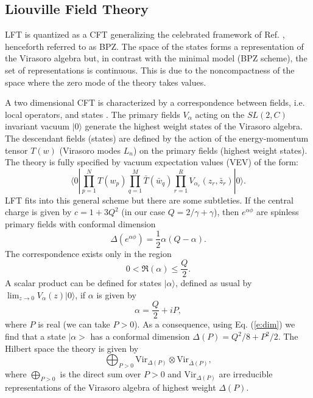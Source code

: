 \documentclass[a4paper,aps,prd,twocolumn,groupedaddress]{revtex4}
\begin{document}
\subsection{Liouville Field Theory}
LFT is quantized as a CFT generalizing the celebrated framework of
Ref. \cite{bpz}, henceforth referred to as BPZ. The space of the
states forms a representation of the Virasoro algebra but, in contrast
with the minimal model (BPZ scheme), the set of representations is
continuous. This is due to the noncompactness of the space where the
zero mode of the theory takes values.

A two dimensional CFT is characterized by a correspondence between
fields, i.e. local operators, and states \cite{cft}. The primary
fields $V_\alpha$ acting on the $SL(2,C)$ invariant vacuum $|0\rangle$
generate the highest weight states of the Virasoro algebra. The
descendant fields (states) are defined by the action of the
energy-momentum tensor $T(w)$ (Virasoro modes $L_n$) on the primary
fields (highest weight states). The theory is fully specified by
vacuum expectation values (VEV) of the form:
\begin{equation}\label{e:vacuum}
\langle 0 | \prod_{p=1}^N T(w_p) \prod_{q=1}^M \bar{T}(\bar{w}_q)
\prod_{r=1}^R V_{\alpha_r}(z_r,\bar{z}_r) | 0 \rangle .
\end{equation}
LFT fits into this general scheme but there are some subtleties. 
If the central
charge is given by $c=1+3Q^2$ (in our case $Q=2/\gamma + \gamma$),
then $e^{\alpha\phi}$ are spinless primary fields with conformal
dimension
\begin{equation}\label{e:dim}
\Delta(e^{\alpha\phi}) = \frac{1}{2}\alpha(Q-\alpha).
\end{equation}
The correspondence exists only in the
region
\begin{displaymath}
0 < \Re(\alpha) \le \frac{Q}{2}.
\end{displaymath}
A scalar product can be defined for states $|\alpha \rangle$, defined
as usual by $\lim_{z\to 0} V_\alpha(z) |0\rangle$, if $\alpha$ is
given by
\begin{displaymath}
\alpha = \frac{Q}{2} + iP,
\end{displaymath}
where $P$ is real (we can take $P>0$). As a consequence, using
Eq. (\ref{e:dim}) we find that a state $|\alpha >$ has a conformal
dimension $\Delta(P) = Q^2/8 + P^2/2$. The Hilbert space  the theory
is given by
\begin{equation}\label{e:hilbert}
\bigoplus_{P>0} \text{Vir}_{\Delta(P)}\otimes 
\text{Vir}_{\bar\Delta(P)},
\end{equation}
where $\bigoplus_{P>0}$ is the direct sum over $P>0$ and
$\text{Vir}_{\Delta(P)}$ are irreducible representations of the
Virasoro algebra of highest weight $\Delta(P)$.
\end{document}
